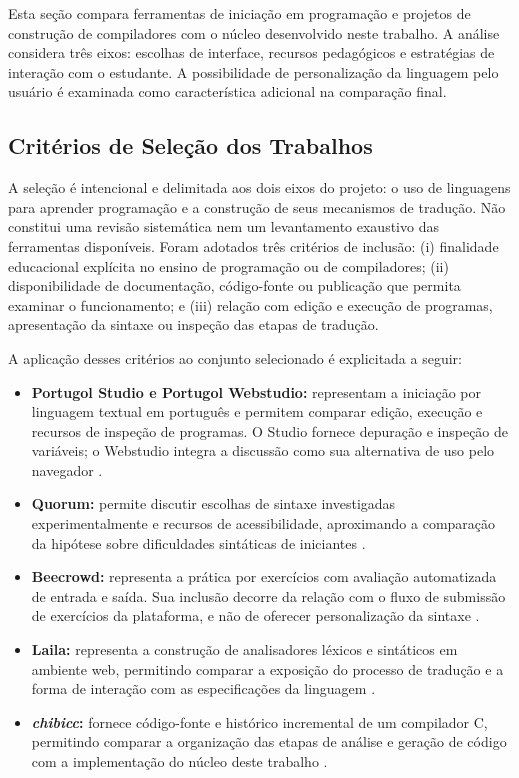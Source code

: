 Esta seção compara ferramentas de iniciação em programação e projetos de construção de compiladores com o núcleo desenvolvido neste trabalho. A análise considera três eixos: escolhas de interface, recursos pedagógicos e estratégias de interação com o estudante. A possibilidade de personalização da linguagem pelo usuário é examinada como característica adicional na comparação final.

\subsection{Critérios de Seleção dos Trabalhos}
\label{sec:selecao-trabalhos}

A seleção é intencional e delimitada aos dois eixos do projeto: o uso de linguagens para aprender programação e a construção de seus mecanismos de tradução. Não constitui uma revisão sistemática nem um levantamento exaustivo das ferramentas disponíveis. Foram adotados três critérios de inclusão: (i) finalidade educacional explícita no ensino de programação ou de compiladores; (ii) disponibilidade de documentação, código-fonte ou publicação que permita examinar o funcionamento; e (iii) relação com edição e execução de programas, apresentação da sintaxe ou inspeção das etapas de tradução.

A aplicação desses critérios ao conjunto selecionado é explicitada a seguir:
\begin{itemize}
    \item \textbf{Portugol Studio e Portugol Webstudio:} representam a iniciação por linguagem textual em português e permitem comparar edição, execução e recursos de inspeção de programas. O Studio fornece depuração e inspeção de variáveis; o Webstudio integra a discussão como sua alternativa de uso pelo navegador \cite{univali2026,martins2025}.
    \item \textbf{Quorum:} permite discutir escolhas de sintaxe investigadas experimentalmente e recursos de acessibilidade, aproximando a comparação da hipótese sobre dificuldades sintáticas de iniciantes \cite{stefik2013,quorum2025}.
    \item \textbf{Beecrowd:} representa a prática por exercícios com avaliação automatizada de entrada e saída. Sua inclusão decorre da relação com o fluxo de submissão de exercícios da plataforma, e não de oferecer personalização da sintaxe \cite{ferreira2025,beecrowd2026faq}.
    \item \textbf{Laila:} representa a construção de analisadores léxicos e sintáticos em ambiente web, permitindo comparar a exposição do processo de tradução e a forma de interação com as especificações da linguagem \cite{ladgelson2021}.
    \item \textbf{\textit{chibicc}:} fornece código-fonte e histórico incremental de um compilador C, permitindo comparar a organização das etapas de análise e geração de código com a implementação do núcleo deste trabalho \cite{ueyama2020}.
\end{itemize}

